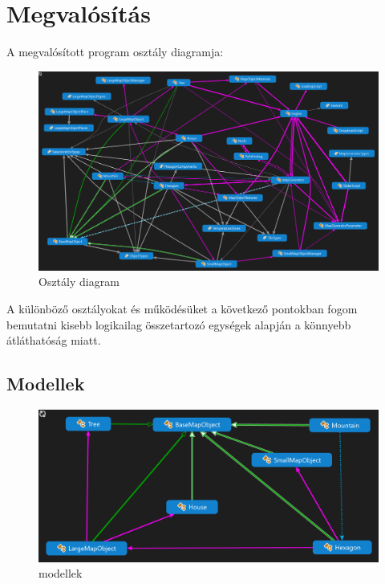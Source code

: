 \chapter{Megvalósítás}

A megvalósított program osztály diagramja:

\begin{figure}[h!]
\centering
\includegraphics[scale=0.4]{kepek/szorny.png}
\caption{Osztály diagram}
\label{fig:szorny}
\end{figure}

\noindent A különböző osztályokat és működésüket a következő pontokban fogom bemutatni kisebb logikailag összetartozó egységek alapján a könnyebb átláthatóság miatt. 

\section{Modellek}

\begin{figure}[h!]
\centering
\includegraphics[scale=0.4]{kepek/modellek.png}
\caption{modellek}
\label{fig:modellek}
\end{figure}

